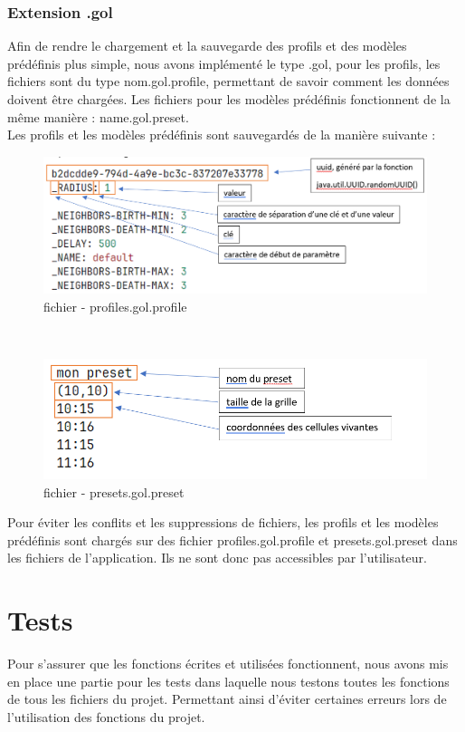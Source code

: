 \documentclass[12pt]{article}
\begin{document}
			\subsubsection{Extension .gol} \label{config}
			Afin de rendre le chargement et la sauvegarde des profils et des modèles prédéfinis plus simple, nous avons implémenté le type .gol, pour les profils, les fichiers sont du type nom.gol.profile, permettant de savoir comment les données doivent être chargées. Les fichiers pour les modèles prédéfinis fonctionnent de la même manière : name.gol.preset.\\
			
			Les profils et les modèles prédéfinis sont sauvegardés de la manière suivante :
			\begin{figure}[!ht]
				\centering
				\includegraphics[width=\textwidth]{images/profiles.png}
				\caption{fichier - profiles.gol.profile}
			\end{figure}\\
			\begin{figure}[!ht]
				\centering
				\includegraphics[width=\textwidth]{images/presets.png}
				\caption{fichier - presets.gol.preset}
			\end{figure}
			
			Pour éviter les conflits et les suppressions de fichiers, les profils et les modèles prédéfinis sont chargés sur des fichier profiles.gol.profile et presets.gol.preset dans les fichiers de l’application. Ils ne sont donc pas accessibles par l’utilisateur.
			
			\section{Tests} \label{tests}
			Pour s’assurer que les fonctions écrites et utilisées fonctionnent, nous avons mis en place une partie pour les tests dans laquelle nous testons toutes les fonctions de tous les fichiers du projet. Permettant ainsi d’éviter certaines erreurs lors de l’utilisation des fonctions du projet.
			
\end{document}
